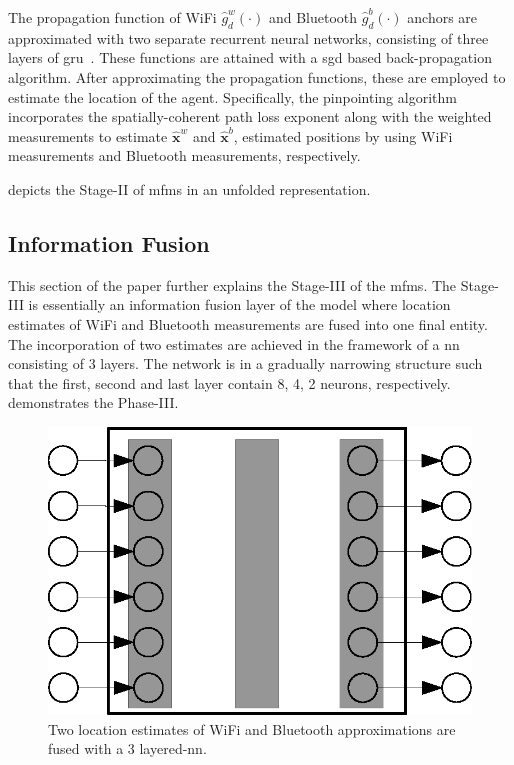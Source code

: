     The propagation function of WiFi $\hat{g}^w_d(\cdot)$ and Bluetooth $\hat{g}^b_d(\cdot)$ anchors are approximated with two separate recurrent neural networks, consisting of three layers of \gls{gru}~\cite{cho2014learning}.
    These functions are attained with a \gls{sgd} based back-propagation algorithm.
    After approximating the propagation functions, these are employed to estimate the location of the agent.
    Specifically, the pinpointing algorithm incorporates the spatially-coherent path loss exponent along with the weighted measurements to estimate $\bm{\hat{x}}^w$ and $\bm{\hat{x}}^b$, estimated positions by using WiFi measurements and Bluetooth measurements, respectively.

     depicts the Stage-II of \gls{mfms} in an unfolded representation.


    \subsection{Information Fusion}
    This section of the paper further explains the Stage-III of the \gls{mfms}.
    The Stage-III is essentially an information fusion layer of the model where location estimates of WiFi and Bluetooth measurements are fused into one final entity.
    The incorporation of two estimates are achieved in the framework of a \gls{nn} consisting of 3 layers.
    The network is in a gradually narrowing structure such that the first, second and last layer contain 8, 4, 2 neurons, respectively.
     demonstrates the Phase-III\@.

    \begin{figure}[thpb]
       \centering
       \includegraphics[width=0.95\linewidth]{figures/fusion.eps}
       \caption{\label{fig:fusion}Two location estimates of WiFi and Bluetooth approximations are fused with a 3 layered-\gls{nn}.}
    \end{figure}

